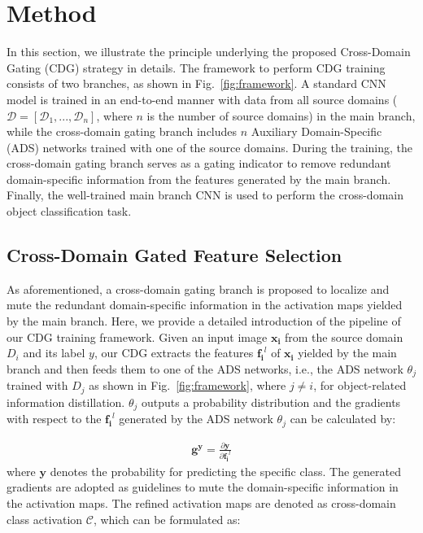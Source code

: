 \section{Method}
\label{sec:cdg}
In this section, we illustrate the principle underlying the proposed Cross-Domain Gating (CDG) strategy in details. The framework to perform CDG training consists of two branches, as shown in Fig.~\ref{fig:framework}. A standard CNN model is trained in an end-to-end manner with data from all source domains ($\mathcal{D}=[\mathcal{D}_{1}, ..., \mathcal{D}_{n}]$, where $n$ is the number of source domains) in the main branch, while the cross-domain gating branch includes $n$ Auxiliary Domain-Specific (ADS) networks trained with one of the source domains. During the training, the cross-domain gating branch serves as a gating indicator to remove redundant domain-specific information from the features generated by the main branch. Finally, the well-trained main branch CNN is used to perform the cross-domain object classification task. 



\subsection{Cross-Domain Gated Feature Selection}
As aforementioned, a cross-domain gating branch is proposed to localize and mute the redundant domain-specific information in the activation maps yielded by the main branch. Here, we provide a detailed introduction of the pipeline of our CDG training framework. Given an input image $\mathbf{x_i}$ from the source domain $D_i$ and its label $y$, our CDG extracts the  features $\mathbf{f_{i}}^l$ of $\mathbf{x_i}$ yielded by the main branch and then feeds them to one of the ADS networks, i.e., the ADS network $\theta_j$ trained with $D_j$ as shown in Fig.~\ref{fig:framework}, where $j \neq i$, for object-related information distillation. $\theta_j$ outputs a probability distribution and the gradients with respect to the $\mathbf{f_{i}}^l$ generated by the ADS network $\theta_j$ can be calculated by: 

\begin{eqnarray}
  \label{eqn:gradient}
  \mathbf{g^{\mathbf{y}}} = \frac{\partial \mathbf{y}}{\partial \mathbf{f_{i}}^l}
\end{eqnarray}
where $\mathbf{y}$ denotes the probability for predicting the specific class. The generated gradients are adopted as guidelines to mute the domain-specific information in the activation maps. The refined activation maps are denoted as cross-domain class activation $\mathcal{C}$, which can be formulated as:

